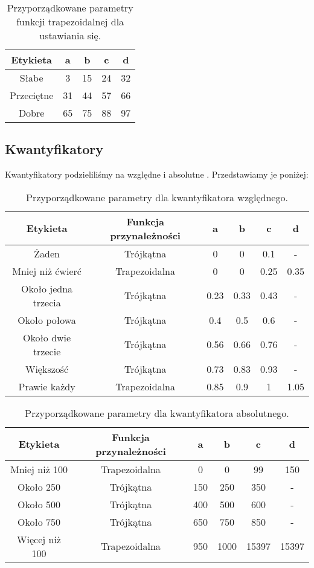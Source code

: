\documentclass{classrep}
\begin{document}
\begin{table}[H]
	\centering
	\begin{tabular}{c c c c c} 
		\hline
		\textbf{Etykieta} & \textbf{a} & \textbf{b} & \textbf{c} &  \textbf{d} \\ [0.5ex] 
		\hline
		\hline 
		Słabe & 3 & 15 & 24 & 32 \\ 
		Przeciętne & 31 & 44 & 57 & 66 \\
		Dobre & 65 & 75 & 88 & 97 \\
		\hline
	\end{tabular}
	\caption{Przyporządkowane parametry funkcji trapezoidalnej dla ustawiania się.}
\end{table}

\subsection{Kwantyfikatory}
Kwantyfikatory podzieliliśmy na względne i absolutne . Przedstawiamy je poniżej:

\begin{table}[H]
	\centering
	\begin{tabular}{c c c c c c} 
		\hline
		\textbf{Etykieta} & \textbf{Funkcja przynależności} & \textbf{a} & \textbf{b} & \textbf{c} &  \textbf{d} \\ [0.5ex] 
		\hline
		\hline 
		Żaden & Trójkątna & 0 & 0 & 0.1 & - \\ 
		Mniej niż ćwierć & Trapezoidalna & 0 & 0 & 0.25 & 0.35 \\
		Około jedna trzecia & Trójkątna & 0.23 & 0.33 & 0.43 & - \\
		Około połowa & Trójkątna & 0.4 & 0.5 & 0.6 & - \\
		Około dwie trzecie & Trójkątna & 0.56 & 0.66 & 0.76 & - \\
		Większość & Trójkątna & 0.73 & 0.83 & 0.93 & - \\
		Prawie każdy & Trapezoidalna & 0.85 & 0.9 & 1 & 1.05 \\
		\hline
	\end{tabular}
	\caption{Przyporządkowane parametry dla kwantyfikatora względnego.}
\end{table}
\begin{table}[H]
	\centering
	\begin{tabular}{c c c c c c} 
		\hline
		\textbf{Etykieta} & \textbf{Funkcja przynależności} & \textbf{a} & \textbf{b} & \textbf{c} &  \textbf{d} \\ [0.5ex] 
		\hline
		\hline 
		Mniej niż 100 & Trapezoidalna & 0 & 0 & 99 & 150 \\ 
		Około 250 & Trójkątna & 150 & 250 & 350 & - \\
		Około 500 & Trójkątna & 400 & 500 & 600 & - \\
		Około 750 & Trójkątna & 650 & 750 & 850 & - \\
		Więcej niż 100 & Trapezoidalna & 950 & 1000 & 15397 & 15397 \\
		\hline
	\end{tabular}
	\caption{Przyporządkowane parametry dla kwantyfikatora absolutnego.}
\end{table}
\end{document}
